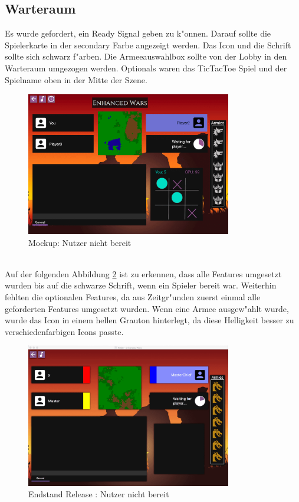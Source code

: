\documentclass[12pt, titlepage]{scrartcl}
\newcommand{\RN}[1]{%
	\textup{\uppercase\expandafter{\romannumeral#1}}%
}
\begin{document}
		\subsection{Warteraum}
			Es wurde gefordert, ein Ready Signal geben zu k"onnen. Darauf sollte die Spielerkarte in der secondary Farbe angezeigt werden. Das Icon und die Schrift sollte sich schwarz f"arben. Die Armeeauswahlbox sollte von der Lobby in den Warteraum umgezogen werden. Optionals waren das TicTacToe Spiel und der Spielname oben in der Mitte der Szene.
			\begin{figure}[H] 
				\centering
				\includegraphics[width=0.8\textwidth]{images/mockups/NotReady.png}
				\caption{Mockup: Nutzer nicht bereit}
				\label{Not_Ready_2}
			\end{figure}
			\ \\ Auf der folgenden Abbildung \ref{End_Not_Ready} ist zu erkennen, dass alle Features umgesetzt wurden bis auf die schwarze Schrift, wenn ein Spieler bereit war. Weiterhin fehlten die optionalen Features, da aus Zeitgr"unden zuerst einmal alle geforderten Features umgesetzt wurden. Wenn eine Armee ausgew"ahlt wurde, wurde das Icon in einem hellen Grauton hinterlegt, da diese Helligkeit besser zu verschiedenfarbigen Icons passte.
			\begin{figure}[H] 
				\centering
				\includegraphics[width=0.8\textwidth]{images/endOfRelease/NotReady.png}
				\caption{Endstand Release \RN{3}: Nutzer nicht bereit}
				\label{End_Not_Ready}
			\end{figure}
\end{document}
